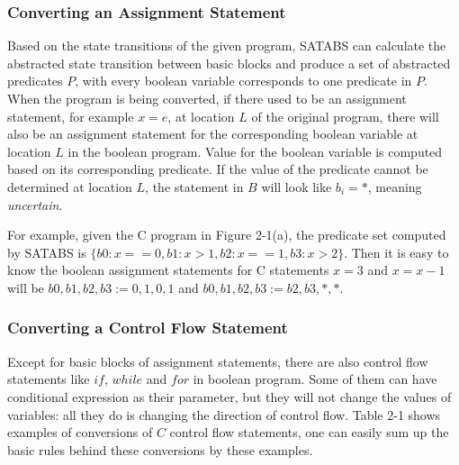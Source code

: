 \documentclass[10pt,journal,final,]{article}
\theoremstyle{definition}
\begin{document}
\subsubsection{Converting an Assignment Statement}
\label{section:ConvertingAnAssignmentStatement}
Based on the state transitions of the given program, SATABS can calculate the abstracted state transition between basic blocks and produce a set of abstracted predicates $P$, with every boolean variable corresponds to one predicate in $P$.
When the program is being converted, if there used to be an assignment statement, for example $x = e$, at location $L$ of the original program, there will also be an assignment statement for the corresponding boolean variable at location $L$ in the boolean program\cite{MLS:STEPaBP}.
Value for the boolean variable is computed based on its corresponding predicate.
If the value of the predicate cannot be determined at location $L$, the statement in $B$ will look like $b_{i} = *$, meaning {\it uncertain}.

For example, given the C program in Figure 2-1(a), the predicate set computed by SATABS is $\{b0 : x == 0, b1 : x > 1, b2 : x == 1, b3 : x > 2\}$. Then it is easy to know the boolean assignment statements for C statements $x = 3$ and $x = x - 1$ will be $b0,b1,b2,b3 := 0,1,0,1$ and $b0,b1,b2,b3 := b2,b3,*,*$.

\subsubsection{Converting a Control Flow Statement}
\label{section:ConvertingAControlFlowStatement}
Except for basic blocks of assignment statements, there are also control flow statements like $if$, $while$ and $for$ in boolean program.
Some of them can have conditional expression as their parameter, but they will not change the values of variables: all they do is changing the direction of control flow.
Table 2-1 shows examples of conversions of $C$ control flow statements, one can easily sum up the basic rules behind these conversions by these examples.
\end{document}
